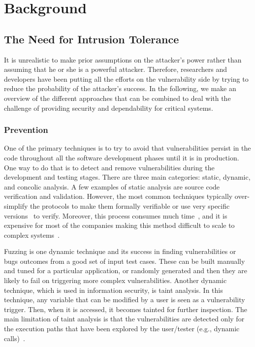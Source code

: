 \chapter{Background}
\label{chap:related_work}


\section{The Need for Intrusion Tolerance}

It is unrealistic to make prior assumptions on the attacker's power rather than assuming that he or she is a powerful attacker.
Therefore, researchers and developers have been putting all the efforts on the vulnerability side by trying to reduce the probability of the attacker's success. 
In the following, we make an overview of the different approaches that can be combined to deal with the challenge of providing security and dependability for critical systems.

\subsection{Prevention}
One of the primary techniques is to try to avoid that vulnerabilities persist in the code throughout all the software development phases until it is in production. 
One way to do that is to detect and remove vulnerabilities during the development and testing stages.
There are three main categories: static, dynamic, and concolic analysis.
A few examples of static analysis are source code verification and validation. 
However, the most common techniques typically over-simplify the protocols to make them formally verifiable or use very specific versions~\cite{Klein:2009,Nelson:2017} to verify. 
Moreover, this process consumes much time~\cite{Klein:2009}, and it is expensive for most of the companies making this method difficult to scale to complex systems~\cite{Giuffrida:2013}.

Fuzzing is one dynamic technique and its success in finding vulnerabilities or bugs outcomes from a good set of input test cases.
These can be built manually and tuned for a particular application, or randomly generated and then they are likely to fail on triggering more complex vulnerabilities.
Another dynamic technique, which is used in information security, is taint analysis.
In this technique, any variable that can be modified by a user is seen as a vulnerability trigger. 
Then, when it is accessed, it becomes tainted for further inspection.
The main limitation of taint analysis is that the vulnerabilities are detected only for the execution paths that have been explored by the user/tester (e.g., dynamic calls)~\cite{Yamaguchi:2015}.

